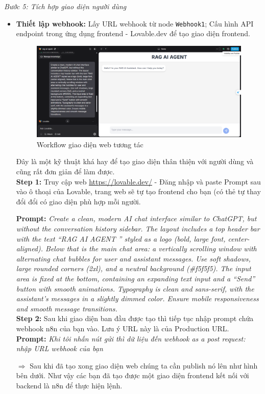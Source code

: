 \textit{Bước 5: Tích hợp giao diện người dùng}
\begin{itemize}
    \item \textbf{Thiết lập webhook:} Lấy URL webhook từ node \texttt{Webhook1}; Cấu hình API endpoint trong ứng dụng frontend - Lovable.dev để tạo giao diện frontend.
    
    \begin{figure}[H]
    \centering
    \includegraphics[width=1\textwidth]{images/1rag02.pdf}
    \caption{Workflow giao diện web tương tác}
    \end{figure}
Đây là một kỹ thuật khá hay để tạo giao diện thân thiện với người dùng và cũng rất đơn giản để làm được.\\

\textbf{Step 1:} Truy cập web \url{https://lovable.dev/} - Đăng nhập và paste Prompt sau vào ô thoại của Lovable, trang web sẽ tự tạo frontend cho bạn (có thẻ tự thay đổi đổi có giao diện phù hợp mỗi người.

\textbf{Prompt:} \emph{Create a clean, modern AI chat interface similar to ChatGPT, but without the conversation history sidebar. The layout includes a top header bar with the text \textquotedblleft RAG AI AGENT \textquotedblright{} styled as a logo (bold, large font, center-aligned). Below that is the main chat area: a vertically scrolling window with alternating chat bubbles for user and assistant messages. Use soft shadows, large rounded corners (2xl), and a neutral background (\#f5f5f5). The input area is fixed at the bottom, containing an expanding text input and a \textquotedblleft Send\textquotedblright{} button with smooth animations. Typography is clean and sans-serif, with the assistant’s messages in a slightly dimmed color. Ensure mobile responsiveness and smooth message transitions.}\\

\textbf{Step 2:} Sau khi giao diện ban đầu được tạo thì tiếp tục nhập prompt chứa webhook n8n của bạn vào. Lưu ý URL này là của Production URL. \\

\textbf{Prompt:} \emph{
Khi tôi nhấn nút gửi thì dữ liệu đến webhook as a post request: nhập URL webhook của bạn}

$\Rightarrow$ Sau khi đã tạo xong giao diện web chúng ta cần publish nó lên như hình bên dưới. Như vậy các bạn đã tạo được một giao diện frontend kết nối với backend là n8n để thực hiện lệnh.
\end{itemize}    
